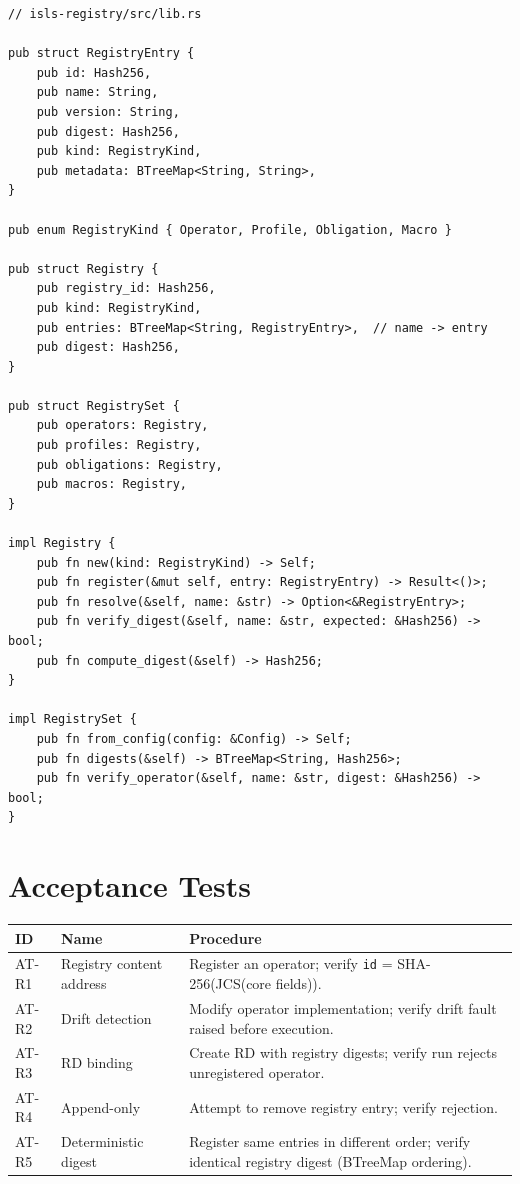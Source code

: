 \documentclass[11pt,a4paper,twoside]{article}
\theoremstyle{definition}
\theoremstyle{plain}
\theoremstyle{remark}
\begin{document}
\begin{verbatim}
// isls-registry/src/lib.rs

pub struct RegistryEntry {
    pub id: Hash256,
    pub name: String,
    pub version: String,
    pub digest: Hash256,
    pub kind: RegistryKind,
    pub metadata: BTreeMap<String, String>,
}

pub enum RegistryKind { Operator, Profile, Obligation, Macro }

pub struct Registry {
    pub registry_id: Hash256,
    pub kind: RegistryKind,
    pub entries: BTreeMap<String, RegistryEntry>,  // name -> entry
    pub digest: Hash256,
}

pub struct RegistrySet {
    pub operators: Registry,
    pub profiles: Registry,
    pub obligations: Registry,
    pub macros: Registry,
}

impl Registry {
    pub fn new(kind: RegistryKind) -> Self;
    pub fn register(&mut self, entry: RegistryEntry) -> Result<()>;
    pub fn resolve(&self, name: &str) -> Option<&RegistryEntry>;
    pub fn verify_digest(&self, name: &str, expected: &Hash256) -> bool;
    pub fn compute_digest(&self) -> Hash256;
}

impl RegistrySet {
    pub fn from_config(config: &Config) -> Self;
    pub fn digests(&self) -> BTreeMap<String, Hash256>;
    pub fn verify_operator(&self, name: &str, digest: &Hash256) -> bool;
}
\end{verbatim}

\section{Acceptance Tests}\label{sec:reg:tests}

\begin{tabularx}{\textwidth}{l l X}
\toprule
\textbf{ID} & \textbf{Name} & \textbf{Procedure} \\
\midrule
AT-R1 & Registry content address & Register an operator; verify
  \texttt{id} = SHA-256(JCS(core fields)). \\
AT-R2 & Drift detection & Modify operator implementation; verify drift
  fault raised before execution. \\
AT-R3 & RD binding & Create RD with registry digests; verify run rejects
  unregistered operator. \\
AT-R4 & Append-only & Attempt to remove registry entry; verify
  rejection. \\
AT-R5 & Deterministic digest & Register same entries in different order;
  verify identical registry digest (BTreeMap ordering). \\
\bottomrule
\end{tabularx}
\end{document}
